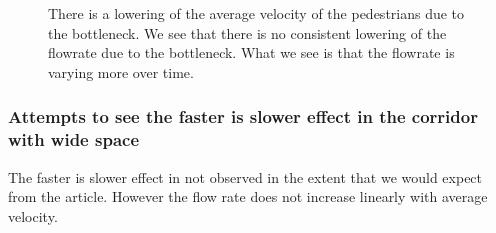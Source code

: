 \begin{figure}[h]
\caption{There is a lowering of the average velocity of the pedestrians due to the bottleneck. We see that there is no consistent lowering of the flowrate due to the bottleneck. What we see is that the flowrate is varying more over time.}
\label{fig:effect-of-widespace}
\end{figure}

\subsubsection{Attempts to see the faster is slower effect in the corridor with wide space}
The faster is slower effect in not observed in the extent that we would expect from 
the article. However the flow rate does not increase linearly with average velocity. 
 
